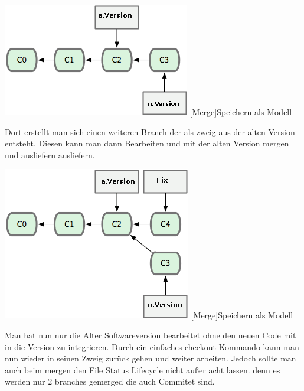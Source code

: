 \documentclass[12pt,a4paper,bibliography=totocnumbered,listof=totocnumbered]{scrartcl}
\begin{document}
\vspace{1em}
\begin{minipage}{\linewidth}
	\centering
	\includegraphics[width=0.5\linewidth]{Bilder/merge.png}
	[Merge]{Speichern als Modell\footnotemark }
	\label{fig:gitspeichern}
\end{minipage} 	

Dort erstellt man sich einen weiteren Branch der als zweig aus der alten Version entsteht. Diesen kann man dann Bearbeiten und mit der alten Version mergen und ausliefern ausliefern.
 
\vspace{1em}
\begin{minipage}{\linewidth}
	\centering
	\includegraphics[width=0.6\linewidth]{Bilder/merge-fix.png}
	[Merge]{Speichern als Modell\footnotemark }
	\label{fig:gitspeichern}
\end{minipage}
Man hat nun nur die Alter Softwareversion bearbeitet ohne den neuen Code
mit in die Version zu integrieren. Durch ein einfaches checkout Kommando kann man nun wieder in seinen Zweig zurück gehen und weiter arbeiten. Jedoch sollte man auch beim mergen den File Status Lifecycle nicht außer acht lassen. denn es werden nur 2 branches gemerged die auch Commitet sind.
\end{document}
